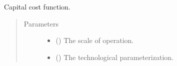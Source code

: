 \documentclass[letterpaper,10pt,english]{sphinxmanual}
\begin{document}
\begin{fulllineitems}
\label{\detokenize{technology:technology.tutorial_basic.fixed_cost}}
Capital cost function.
\begin{quote}\begin{description}
\item[{Parameters}] \leavevmode\begin{itemize}
\item {} 
 () \textendash{} The scale of operation.

\item {} 
 () \textendash{} The technological parameterization.

\end{itemize}

\end{description}\end{quote}

\end{fulllineitems}

\end{document}
